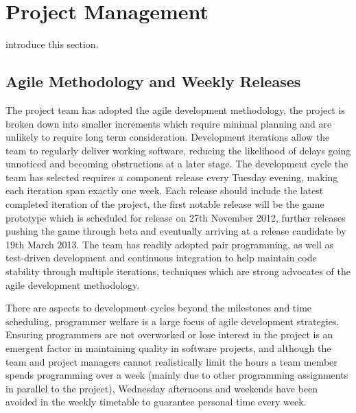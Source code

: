 \chapter[Project Management]{Project Management}
\label{ch:management}


 introduce this section.





\section{Agile Methodology and Weekly Releases}
The project team has adopted the agile development methodology, the project is broken down into smaller increments which require minimal planning and are unlikely to require long term consideration. Development iterations allow the team to regularly deliver working software, reducing the likelihood of delays going unnoticed and becoming obstructions at a later stage. The development cycle the team has selected requires a component release every Tuesday evening, making each iteration span exactly one week. Each release should include the latest completed iteration of the project, the first notable release will be the game prototype which is scheduled for release on 27th November 2012, further releases pushing the game through beta and eventually arriving at a release candidate by 19th March 2013.
The team has readily adopted pair programming, as well as test-driven development and continuous integration to help maintain code stability through multiple iterations, techniques which are strong advocates of the agile development methodology.

There are aspects to development cycles beyond the milestones and time scheduling, programmer welfare is a large focus of agile development strategies. Ensuring programmers are not overworked or lose interest in the project is an emergent factor in maintaining quality in software projects, and although the team and project managers cannot realistically limit the hours a team member spends programming over a week (mainly due to other programming assignments in parallel to the project), Wednesday afternoons and weekends have been avoided in the weekly timetable to guarantee personal time every week.


